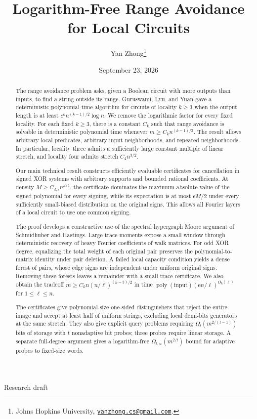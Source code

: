 \documentclass[letterpaper,11pt]{article}
\title{Logarithm-Free Range Avoidance for Local Circuits}
\author{Yan Zhong\thanks{Johns Hopkins University,
  \texttt{\href{mailto:yanzhong.cs@gmail.com}{yanzhong.cs@gmail.com}}.}}
\date{September 23, 2026}
\theoremstyle{definition}
\DeclareMathOperator{\poly}{poly}
\begin{document}
\hypersetup{pageanchor=false}
\begin{titlepage}
\maketitle
\thispagestyle{empty}
\begin{abstract}
The range avoidance problem asks, given a Boolean circuit with more
outputs than inputs, to find a string outside its range. Guruswami,
Lyu, and Yuan gave a deterministic polynomial-time algorithm for
circuits of locality $k\ge3$ when the output length is at least
$c^k n^{(k-1)/2}\log n$. We remove the logarithmic factor for every
fixed locality. For each fixed $k\ge3$, there is a constant $C_k$ such
that range avoidance is solvable in deterministic polynomial time
whenever $m\ge C_k n^{(k-1)/2}$. The result allows arbitrary local
predicates, arbitrary input neighborhoods, and repeated neighborhoods.
In particular, locality three admits a sufficiently large constant
multiple of linear stretch, and locality four admits stretch
$C_4n^{3/2}$.

Our main technical result constructs efficiently evaluable certificates
for cancellation in signed XOR systems with arbitrary supports and
bounded rational coefficients. At density $M\ge C_{d,\epsilon}n^{d/2}$,
the certificate dominates the maximum absolute value of the signed
polynomial for every signing, while its expectation is at most
$\epsilon M/2$ under every sufficiently small-biased distribution on
the original signs. This allows all Fourier layers of a local circuit
to use one common signing.

The proof develops a constructive use of the spectral hypergraph Moore
argument of Schmidhuber and Hastings. Large trace moments expose a small
window through deterministic recovery of heavy Fourier coefficients
of walk matrices. For odd XOR degree, equalizing the total weight of
each original pair preserves the polynomial-to-matrix identity under
pair deletion. A failed local capacity condition yields a dense forest
of pairs, whose edge signs are independent under uniform original
signs. Removing these forests leaves a remainder with a small trace
certificate. We also obtain the tradeoff
$m\ge C_k n(n/\ell)^{(k-3)/2}$ in time
$\poly(\text{input})(\mathrm e n/\ell)^{O_k(\ell)}$ for
$1\le\ell\le n$.

The certificates give polynomial-size one-sided distinguishers that
reject the entire image and accept at least half of uniform strings,
excluding local demi-bits generators at the same stretch. They also
give explicit query problems requiring $\Omega_t(m^{2/(t-1)})$ bits
of storage with $t$ nonadaptive bit probes; three probes require
linear storage. A separate full-degree argument gives a
logarithm-free $\Omega_{t,w}(m^{2/t})$ bound for adaptive probes
to fixed-size words.
\end{abstract}
\vfill
\begin{center}\small Research draft\end{center}
\end{titlepage}
{\small\tableofcontents}
\thispagestyle{empty}
\clearpage
\setcounter{page}{1}
\hypersetup{pageanchor=true}
\end{document}
